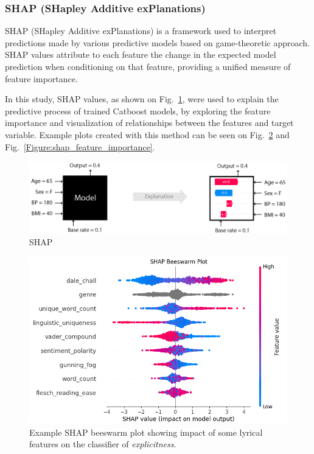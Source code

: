 \subsubsection*{SHAP (SHapley Additive exPlanations)}

SHAP (SHapley Additive exPlanations) is a framework used to interpret
predictions made by various predictive models based on game-theoretic approach.
SHAP values attribute to each feature the change in the expected model
prediction when conditioning on that feature, providing a unified measure
of feature importance.\cite{shap}

In this study, SHAP values, as shown on Fig.~\ref{Figure:shap_intro}, were used to
explain the predictive process of trained Catboost models, by exploring the
feature importance and visualization of relationships between the features and
target variable. Example plots created with this method can be seen on
Fig.~\ref{Figure:shap_beeswarm} and Fig.~\ref{Figure:shap_feature_importance}.

\begin{center}
  \begin{figure}[H]
  \centering
  \includegraphics[width=6in]{img/shap_intro.png}
  \caption{SHAP}
  \label{Figure:shap_intro}
\end{figure}
\end{center}

\begin{center}
  \begin{figure}[H]
  \centering
  \includegraphics[width=6in]{img/shap_beeswarm.png}
  \caption{Example SHAP beeswarm plot showing impact of some lyrical features
  on the classifier of \textit{explicitness}.}
  \label{Figure:shap_beeswarm}
\end{figure}
\end{center}

